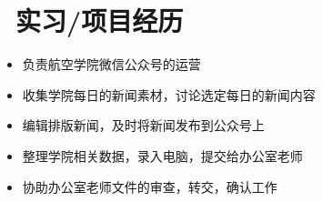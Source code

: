 \documentclass{resume}
\begin{document}
\section{\faUsers\ 实习/项目经历}
\begin{itemize}
  \item 负责航空学院微信公众号的运营
  \item 收集学院每日的新闻素材，讨论选定每日的新闻内容
  \item 编辑排版新闻，及时将新闻发布到公众号上
\end{itemize}

\begin{itemize}
  \item 整理学院相关数据，录入电脑，提交给办公室老师
  \item 协助办公室老师文件的审查，转交，确认工作
\end{itemize}






\end{document}
